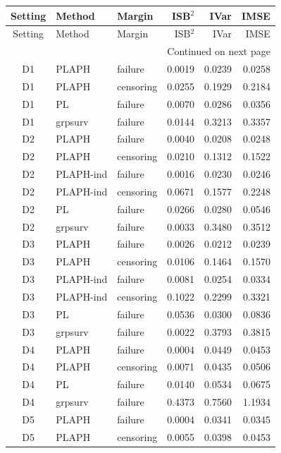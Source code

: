 \begin{longtable}{cllrrr}

\label{tab:e10-function-overall}\\
\toprule
Setting & Method & Margin & ISB$^2$ & IVar & IMSE \\
\midrule
\endfirsthead
\toprule
Setting & Method & Margin & ISB$^2$ & IVar & IMSE \\
\midrule
\endhead
\midrule
\multicolumn{6}{r}{Continued on next page} \\
\endfoot
\bottomrule
\endlastfoot
D1 & PLAPH & failure & 0.0019 & 0.0239 & 0.0258 \\
D1 & PLAPH & censoring & 0.0255 & 0.1929 & 0.2184 \\
D1 & PL & failure & 0.0070 & 0.0286 & 0.0356 \\
D1 & grpsurv & failure & 0.0144 & 0.3213 & 0.3357 \\
D2 & PLAPH & failure & 0.0040 & 0.0208 & 0.0248 \\
D2 & PLAPH & censoring & 0.0210 & 0.1312 & 0.1522 \\
D2 & PLAPH-ind & failure & 0.0016 & 0.0230 & 0.0246 \\
D2 & PLAPH-ind & censoring & 0.0671 & 0.1577 & 0.2248 \\
D2 & PL & failure & 0.0266 & 0.0280 & 0.0546 \\
D2 & grpsurv & failure & 0.0033 & 0.3480 & 0.3512 \\
D3 & PLAPH & failure & 0.0026 & 0.0212 & 0.0239 \\
D3 & PLAPH & censoring & 0.0106 & 0.1464 & 0.1570 \\
D3 & PLAPH-ind & failure & 0.0081 & 0.0254 & 0.0334 \\
D3 & PLAPH-ind & censoring & 0.1022 & 0.2299 & 0.3321 \\
D3 & PL & failure & 0.0536 & 0.0300 & 0.0836 \\
D3 & grpsurv & failure & 0.0022 & 0.3793 & 0.3815 \\
D4 & PLAPH & failure & 0.0004 & 0.0449 & 0.0453 \\
D4 & PLAPH & censoring & 0.0071 & 0.0435 & 0.0506 \\
D4 & PL & failure & 0.0140 & 0.0534 & 0.0675 \\
D4 & grpsurv & failure & 0.4373 & 0.7560 & 1.1934 \\
D5 & PLAPH & failure & 0.0004 & 0.0341 & 0.0345 \\
D5 & PLAPH & censoring & 0.0055 & 0.0398 & 0.0453 \\

\end{longtable}
